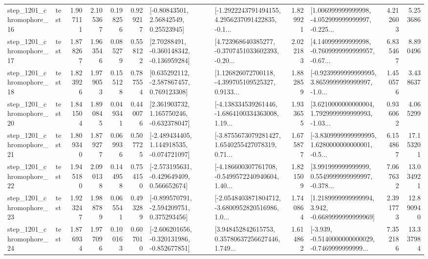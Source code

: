 \begin{tabular}{llrrrrllrlrr}
 step\_1201\_chromophore\_16 &      test &      1.907111 &    2.105367 &      0.198256 &  0.929217 &       [-0.80843501, 2.56842549, 0.25523945] &  [-1.2922243791494155, 4.2956237091422835, -0.1... &       1.829921 &  [1.006999999999998, -4.052999999999997, -0.225... &            4.212603 &          5.253686 \\
 step\_1201\_chromophore\_17 &      test &      1.878267 &    1.963546 &      0.085279 &  0.558122 &    [2.70288491, -0.360148342, -0.136959284] &  [4.723968640385277, -0.3707451033602393, -0.20... &       2.022183 &  [4.140999999999998, -0.7609999999999957, -0.67... &            6.835467 &          8.890496 \\
 step\_1201\_chromophore\_18 &      test &      1.823926 &    1.979053 &      0.155128 &  0.787554 &    [0.635292112, -2.587867457, 0.769123308] &  [1.126826072700118, -4.399705109525327, 0.9133... &       1.882859 &  [-0.9239999999999995, 3.8659999999999997, -1.0... &            1.450576 &          3.438637 \\
 step\_1201\_chromophore\_20 &      test &      1.841504 &    1.890845 &      0.049341 &  0.440076 &    [2.361903732, 1.165750246, -0.632378047] &  [-4.138334539261446, -1.6864100334363008, 1.19... &       1.933655 &  [3.6210000000000004, 1.7929999999999993, -1.03... &            0.936062 &          4.065299 \\
 step\_1201\_chromophore\_21 &      test &      1.809340 &    1.879277 &      0.069936 &  0.507725 &   [-2.489434405, 1.144918535, -0.074721097] &  [-3.8755673079281427, 1.6540255427078319, 0.71... &       1.675877 &  [-3.8309999999999995, 1.6280000000000001, -0.5... &            6.154867 &         17.153201 \\
 step\_1201\_chromophore\_22 &      test &      1.945180 &    2.090138 &      0.144958 &  0.754150 &   [-2.573195631, -0.429649409, 0.566652674] &  [-4.186600307761708, -0.5499572240940604, 1.40... &       1.821509 &  [3.991999999999999, 0.5549999999999997, -0.378... &            7.067632 &         13.034921 \\
 step\_1201\_chromophore\_23 &      test &      1.923247 &    1.988789 &      0.065541 &  0.493289 &   [-0.899570791, -2.594209751, 0.375293456] &  [-2.0548403871804712, -3.6800952820516986, 1.0... &       1.740864 &   [1.2189999999999994, 3.942, -0.6689999999999969] &            2.391773 &         12.890940 \\
 step\_1201\_chromophore\_24 &      test &      1.876934 &    1.977096 &      0.100163 &  0.607010 &  [-2.606201656, -0.320131986, -0.852677851] &  [3.948452842615753, 0.35780637256627446, 1.749... &       1.614862 &  [-3.939, -0.5140000000000029, -0.7469999999999... &            7.352186 &         13.337984 \\

\end{tabular}
